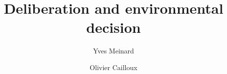 \documentclass[version=3.21, pagesize, twoside=off, bibliography=totoc, DIV=calc, fontsize=12pt, a4paper, french, english]{scrartcl}
\newcommand{\institute}[1]{}
\newcommand{\keywords}[1]{}
\begin{document}
\title{Deliberation and environmental decision}
\author{Yves Meinard \and Olivier Cailloux}
\institute{
	Yves Meinard
	\and
	Olivier Cailloux 
	\at 
	Université Paris-Dauphine, \\
	PSL Research University, \\
	CNRS, \\
	LAMSADE\\
	75016 PARIS, FRANCE\\
	\email{olivier.cailloux@dauphine.fr}
}
\makeatletter
\makeatother
\maketitle

\keywords{decision aid, justification, empirical validation, methodology}
\end{document}
